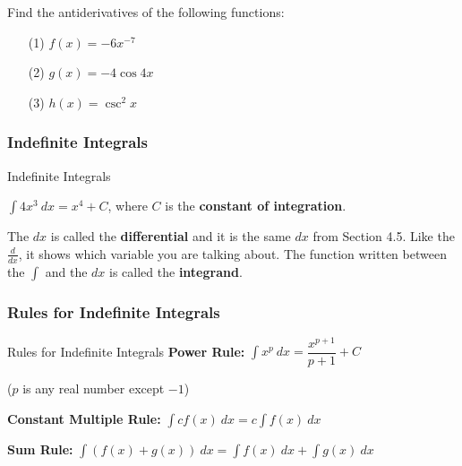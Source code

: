 \documentclass[cal1spr16Lectures.tex]{subfiles}
\begin{document}
\begin{frame}
\begin{ex}
Find the antiderivatives of the following functions:
\begin{itemize}
\item[(1) ]$f(x)=-6x^{-7}$
\item[(2) ]$g(x)=-4\cos{4x}$
\item[(3) ]$h(x)=\csc^2{x}$
\end{itemize}
\end{ex}
\end{frame}

\subsubsection{Indefinite Integrals}

\begin{frame}{\small Indefinite Integrals}\small
\begin{ex} $\int 4x^3\ dx = x^4+C$, where $C$ is the {\bf constant of integration}. \end{ex}

\vspace{1pc}
The $dx$ is called the {\bf differential} and it is the same $dx$ from Section 4.5.  Like the $\frac{d}{dx}$, it shows which variable you are talking about.  The function written between the $\int$ and the $dx$ is called the {\bf integrand}.
\end{frame}

\subsubsection{Rules for Indefinite Integrals}

\begin{frame}{\small Rules for Indefinite Integrals}\footnotesize
{\bf Power Rule:}  $\int x^p\ dx = \dfrac{x^{p+1}}{p+1} + C$ 

\vspace{0.65pc}
\hspace{5ex}($p$ is any real number except $-1$) 

\vspace{1.5pc}
{\bf Constant Multiple Rule:} $\int c f(x)\ dx = c \int f(x)\ dx$

\vspace{1.5pc}
{\bf Sum Rule:} $\int \left(f(x)+g(x) \right)\ dx = \int f(x)\ dx + \int g(x)\ dx$
\end{frame}
\end{document}
